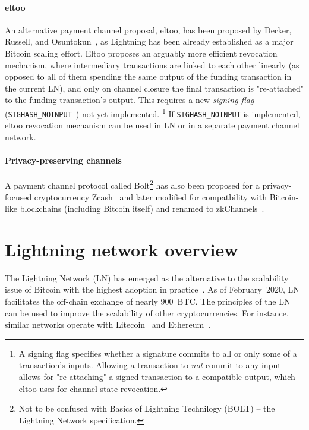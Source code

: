 \paragraph{eltoo}
An alternative payment channel proposal, eltoo, has been proposed by Decker, Russell, and Osuntokun~\cite{Decker2018}, as Lightning has been already established as a major Bitcoin scaling effort.
Eltoo proposes an arguably more efficient revocation mechanism, where intermediary transactions are linked to each other linearly (as opposed to all of them spending the same output of the funding transaction in the current LN), and only on channel closure the final transaction is "re-attached" to the funding transaction's output.
This requires a new \textit{signing flag} (\texttt{SIGHASH\_NOINPUT}~\cite{Decker2017}) not yet implemented.
\footnote{A signing flag specifies whether a signature commits to all or only some of a transaction's inputs. Allowing a transaction to \textit{not} commit to any input allows for "re-attaching" a signed transaction to a compatible output, which eltoo uses for channel state revocation.}
If \texttt{SIGHASH\_NOINPUT} is implemented, eltoo revocation mechanism can be used in LN or in a separate payment channel network.

\paragraph{Privacy-preserving channels}
A payment channel protocol called Bolt\footnote{Not to be confused with Basics of Lightning Technilogy (BOLT) -- the Lightning Network specification.} has also been proposed for a privacy-focused cryptocurrency Zcash~\cite{Green2017} and later modified for compatbility with Bitcoin-like blockchains (including Bitcoin itself) and renamed to zkChannels~\cite{Akinyele2020}.


\section{Lightning network overview}

The Lightning Network (LN) has emerged as the alternative to the scalability issue of Bitcoin with the highest adoption in practice~\cite{Cuen2019}.
As of February~2020, LN facilitates the off-chain exchange of nearly $900$~BTC.
The principles of the LN can be used to improve the scalability of other cryptocurrencies. 
For instance, similar networks operate with Litecoin~\cite{1MLLitecoin} and Ethereum~\cite{RaidenWebsite}. 



